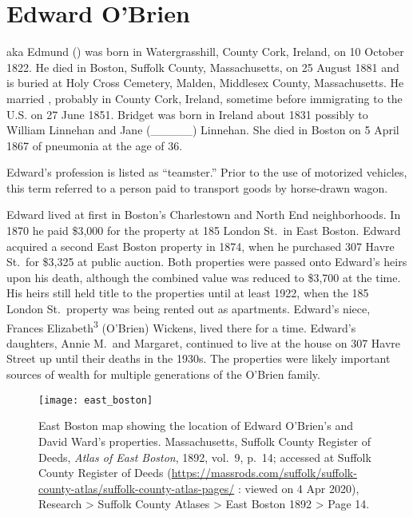 \section{Edward O'Brien}

 aka Edmund\cite{Edmund} () was born in Watergrasshill, County Cork, Ireland, on 10 October 1822.\cite{Edward2OBrienNaturalization} He died in Boston, Suffolk County, Massachusetts, on 25 August 1881\cite{Edward2OBrienDeath} and is buried at Holy Cross Cemetery, Malden, Middlesex County, Massachusetts.\cite{CarolGordon} He married ,\cite{Edward2OBrienMarriage} probably in County Cork, Ireland, sometime before immigrating to the U.S. on 27 June 1851.\cite{Edward2OBrienNaturalization,Edward2OBrienPetition} Bridget was born in Ireland about 1831\cite{BridgetLinnehanDeath} possibly to William Linnehan and Jane (\_\_\_\_\_) Linnehan.\cite{MaryGrahamDeath} She died in Boston on 5 April 1867 of pneumonia at the age of 36.\cite{BridgetLinnehanDeath}

Edward's profession is listed as ``teamster.''\cite{LondonStDeed,Edward2OBrien1876} Prior to the use of motorized vehicles, this term referred to a person paid to transport goods by horse-drawn wagon.\cite{Teamster}

Edward lived at first in Boston's Charlestown\cite{MaryAnn3OBrienBirth} and North End\cite{Edward3OBrienBirth} neighborhoods. In 1870 he paid \$3,000 for the property at 185 London St.\ in East Boston.\cite{LondonStDeed,LondonStMap} Edward acquired a second East Boston property in 1874, when he purchased 307 Havre St.\ for \$3,325 at public auction.\cite{HavrePurchase,HavreMap} Both properties were passed onto Edward's heirs upon his death, although the combined value was reduced to \$3,700 at the time.\cite{Edward2OBrienProbate} His heirs still held title to the properties until at least 1922,\cite{Bromley1922} when the 185 London St.\ property was being rented out as apartments.\cite{GlobeRobbery} Edward's niece, Frances Elizabeth\textsuperscript{3} (O'Brien) Wickens, lived there for a time.\cite{Frances3OBrien1914} Edward's daughters, Annie M.\ and Margaret, continued to live at the house on 307 Havre Street up until their deaths in the 1930s.\cite{AnnMaria3OBrienDeath,Margaret3OBrienDeath} The properties were likely important sources of wealth for multiple generations of the O'Brien family.

\begin{figure}
	\centering
	\texttt{[image: east\_boston]}
	\caption{East Boston map showing the location of Edward O'Brien's and David Ward's properties. Massachusetts, Suffolk County Register of Deeds, \textit{Atlas of East Boston}, 1892, vol.\ 9, p.\ 14; accessed at Suffolk County Register of Deeds (\url{https://massrods.com/suffolk/suffolk-county-atlas/suffolk-county-atlas-pages/} : viewed on 4 Apr 2020), Research > Suffolk County Atlases > East Boston 1892 > Page 14.}
\end{figure}


